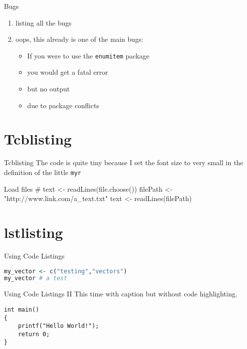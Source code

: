\begin{frame}{Bugs}
\begin{enumerate}
    \item listing all the bugs
    \item oops, this already is one of the main bugs:
    \begin{itemize}
        \item If you were to use the \texttt{enumitem} package
        \item you would get a fatal error
        \item but no output
        \item due to package conflicts
    \end{itemize}
\end{enumerate}
\end{frame}

\section{Tcblisting}

\begin{frame}[fragile]{Tcblisting}
The code is quite tiny because I set the font size to very small in the definition of the little \texttt{myr} 
\begin{myr}{Load files}
# text <- readLines(file.choose())
filePath <- "http://www.link.com/a_text.txt"
text <- readLines(filePath)
\end{myr}
\end{frame}

\section{lstlisting}

\begin{frame}[fragile]{Using Code Listings}
\begin{lstlisting}[language=R]
my_vector <- c("testing","vectors")
my_vector # a test
\end{lstlisting}
\end{frame}

\begin{frame}[fragile]{Using Code Listings II}
This time with caption but without code highlighting.
\begin{lstlisting}[caption={Hello World! in C}]
int main()
{
    printf("Hello World!");
    return 0;
}
\end{lstlisting}
\end{frame}

